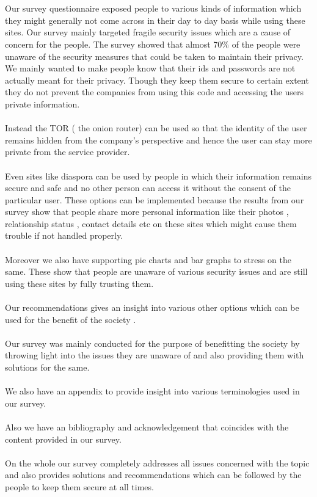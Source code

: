 \documentclass[11pt]{book}
\begin{document}
\\\\Our survey questionnaire exposed people to various kinds of information which they might generally not come across in their day to day basis while using these sites. Our survey mainly targeted fragile security issues which are a cause of concern for the people. The survey showed that almost 70\% of the people were unaware of the security measures that could be taken to maintain their privacy. We mainly wanted to make people know that their ids and passwords are not actually meant for their privacy. Though they keep them secure to certain extent they do not prevent the companies from using this code and accessing the users private information. \\\\Instead the TOR ( the onion router) can be used so that the identity of the user remains hidden from the company's perspective and  hence the user can stay more private from the service provider. \\\\Even sites like diaspora can be used by people in which their information remains secure and safe and no other person can access it without the consent of the particular user. These options can be implemented because the results from our survey show that people share more personal information like their photos , relationship status , contact details etc on these sites which might cause them trouble if not handled properly. \\\\Moreover we also have supporting pie charts and bar graphs to stress on the same. These show that people are unaware of various security issues and are still using these sites by fully trusting them. \\\\Our recommendations gives an insight into various other options which can be used for the benefit of the society . \\\\Our survey was mainly conducted for the purpose of benefitting the society by throwing light into the issues they are unaware of and also providing them with solutions for the same. \\\\We also have an appendix to  provide insight into various terminologies used in our survey. \\\\Also we have an bibliography and acknowledgement  that coincides with the content provided in our survey. \\\\On the whole our survey completely addresses all issues concerned with the topic and also provides solutions and recommendations which can be followed by the people to keep them secure at all times.
\end{document}

